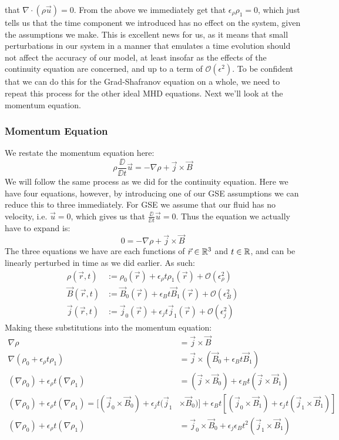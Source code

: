 that $\nabla \cdot (\rho \vec{u}) = 0$. From the above we immediately get that $\epsilon_\rho \rho_1 = 0$, which just tells us that the time component 
we introduced has no effect on the system, given the assumptions we make. This is excellent news for us, as it means that small perturbations 
in our system in a manner that emulates a time evolution should not affect the accuracy of our model, at least insofar as the effects of the 
continuity equation are concerned, and up to a term of $\mathcal{O}(\epsilon^2)$. To be confident that we can do this for the Grad-Shafranov equation on a whole, we need to repeat this process for 
the other ideal MHD equations. Next we'll look at the momentum equation.

\subsubsection{Momentum Equation}
We restate the momentum equation here:
\begin{equation*}
    \rho \frac{\DD}{\DD t}\vec{u} = -\nabla \rho + \vec{j} \times \vec{B}
\end{equation*}
We will follow the same process as we did for the continuity equation. Here we have four equations, however, by introducing one of 
our GSE assumptions we can reduce this to three immediately. For GSE we assume that our fluid has no velocity, i.e. $\vec{u} = 0$, which 
gives us that $\frac{\DD}{\DD t} \vec{u} = 0$. Thus the equation we actually have to expand is:
\begin{equation*}
    0 = -\nabla \rho + \vec{j} \times \vec{B}
\end{equation*}
The three equations we have are each functions of $\vec{r} \in \mathbb{R}^3$ and $t \in \mathbb{R}$, and can be linearly perturbed in time as we did earlier. As such:
\begin{align*}
    \rho(\vec{r}, t) &:= \rho_0(\vec{r}) + \epsilon_\rho t \rho_1(\vec{r}) + \mathcal{O}(\epsilon_\rho^2) \\
    \vec{B}(\vec{r}, t) &:= \vec{B}_0(\vec{r}) + \epsilon_B t \vec{B}_1(\vec{r}) + \mathcal{O}(\epsilon_B^2) \\
    \vec{j}(\vec{r}, t) &:= \vec{j}_0(\vec{r}) + \epsilon_j t \vec{j}_1(\vec{r}) + \mathcal{O}(\epsilon_j^2)
\end{align*}
Making these substitutions into the momentum equation:
\begin{align*}
    \nabla \rho &= \vec{j} \times \vec{B} \\
    \nabla (\rho_0 + \epsilon_\rho t \rho_1) &= \vec{j} \times (\vec{B}_0 + \epsilon_B t \vec{B}_1) \\
    (\nabla \rho_0) + \epsilon_\rho t (\nabla \rho_1) &= (\vec{j} \times \vec{B}_0) + \epsilon_B t (\vec{j} \times \vec{B}_1) \\
    (\nabla \rho_0) + \epsilon_\rho t (\nabla \rho_1) = [(\vec{j}_0 \times \vec{B}_0) + \epsilon_j t (\vec{j}_1 &\times \vec{B}_0)] + \epsilon_B t [(\vec{j}_0 \times \vec{B}_1) + \epsilon_j t (\vec{j}_1 \times \vec{B}_1)] \\
    (\nabla \rho_0) + \epsilon_\rho t (\nabla \rho_1) &= \vec{j}_0 \times \vec{B}_0 + \epsilon_j \epsilon_B t^2 (\vec{j}_1 \times \vec{B}_1)
\end{align*}

